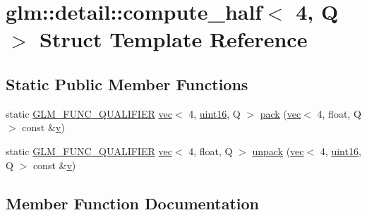 \hypertarget{structglm_1_1detail_1_1compute__half_3_014_00_01_q_01_4}{}\section{glm\+:\+:detail\+:\+:compute\+\_\+half$<$ 4, Q $>$ Struct Template Reference}
\label{structglm_1_1detail_1_1compute__half_3_014_00_01_q_01_4}
\subsection*{Static Public Member Functions}
\begin{DoxyCompactItemize}
\item 
static \mbox{\hyperlink{setup_8hpp_a33fdea6f91c5f834105f7415e2a64407}{G\+L\+M\+\_\+\+F\+U\+N\+C\+\_\+\+Q\+U\+A\+L\+I\+F\+I\+ER}} \mbox{\hyperlink{structglm_1_1vec}{vec}}$<$ 4, \mbox{\hyperlink{namespaceglm_1_1detail_a47b2a7d006d187338e8031a352d1ce56}{uint16}}, Q $>$ \mbox{\hyperlink{structglm_1_1detail_1_1compute__half_3_014_00_01_q_01_4_a93c7385a66d5c429ed3c00f97618d704}{pack}} (\mbox{\hyperlink{structglm_1_1vec}{vec}}$<$ 4, float, Q $>$ const \&\mbox{\hyperlink{_s_d_l__opengl_8h_a10a82eabcb59d2fcd74acee063775f90}{v}})
\item 
static \mbox{\hyperlink{setup_8hpp_a33fdea6f91c5f834105f7415e2a64407}{G\+L\+M\+\_\+\+F\+U\+N\+C\+\_\+\+Q\+U\+A\+L\+I\+F\+I\+ER}} \mbox{\hyperlink{structglm_1_1vec}{vec}}$<$ 4, float, Q $>$ \mbox{\hyperlink{structglm_1_1detail_1_1compute__half_3_014_00_01_q_01_4_a0e7bc963552dffae7fc20fc5dc2e810e}{unpack}} (\mbox{\hyperlink{structglm_1_1vec}{vec}}$<$ 4, \mbox{\hyperlink{namespaceglm_1_1detail_a47b2a7d006d187338e8031a352d1ce56}{uint16}}, Q $>$ const \&\mbox{\hyperlink{_s_d_l__opengl_8h_a10a82eabcb59d2fcd74acee063775f90}{v}})
\end{DoxyCompactItemize}


\subsection{Member Function Documentation}
\mbox{\label{structglm_1_1detail_1_1compute__half_3_014_00_01_q_01_4_a93c7385a66d5c429ed3c00f97618d704}} 
